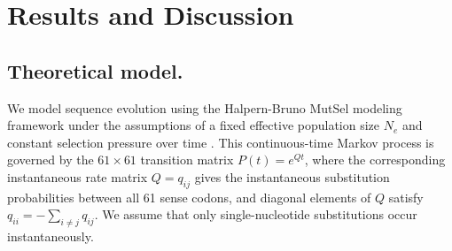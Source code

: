 \documentclass[11pt]{article}
\begin{document}
		
\section*{Results and Discussion}
		
		
\subsection*{Theoretical model.}

We model sequence evolution using the Halpern-Bruno MutSel modeling framework under the assumptions of a fixed effective population size $N_e$ and constant selection pressure over time \cite{HalpernBruno1998,YangNielsen2008,Tamurietal2012,Thorne2012}. This continuous-time Markov process is governed by the $61 \times 61$ transition matrix $P(t) = e^{Qt}$, where the corresponding instantaneous rate matrix $Q = q_{ij}$ gives the instantaneous substitution probabilities between all 61 sense codons, and diagonal elements of $Q$ satisfy $q_{ii} = -\sum_{i \neq j} q_{ij}$. We assume that only single-nucleotide substitutions occur instantaneously.
\end{document}
